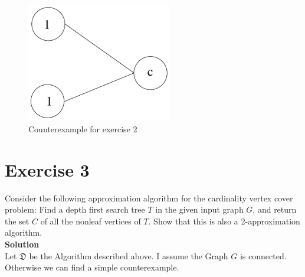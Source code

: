 \documentclass[11pt,a4paper,ngerman]{article}
\begin{document}
\begin{figure}[!t]
	\centering
	\includegraphics[width=2.5in]{ex2_counter}
	\caption{Counterexample for exercise 2}
	\label{fig:2counter}
\end{figure}


\section*{Exercise 3}
Consider the following approximation algorithm for the cardinality vertex cover problem: Find a depth first search tree $T$ in the given input graph $G$, and return the set $C$ of all the nonleaf vertices of $T$. Show that this is also a 2-approximation algorithm.\\

\textbf{Solution}\\
Let $\mathfrak{D}$ be the Algorithm described above. I assume the Graph $G$ is connected. Otherwise we can find a simple counterexample.
\end{document}
